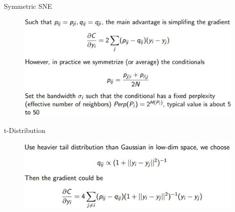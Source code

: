 \begin{frame}[allowframebreaks]{Symmetric SNE}
    \begin{figure}
        \centering
        \includegraphics[width=1\textwidth,keepaspectratio]{images/dul/dim-reduce/symmetric-sne.jpg}
    \end{figure}
\end{frame}

\begin{frame}[allowframebreaks]{t-Distribution}
    \begin{figure}
        \centering
        \includegraphics[width=1\textwidth,keepaspectratio]{images/dul/dim-reduce/t-distribution.jpg}
    \end{figure}
\end{frame}

